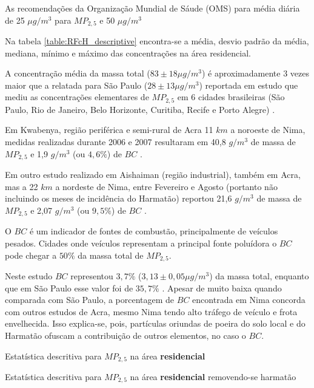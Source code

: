 As recomendações da Organização Mundial de Sáude (OMS) para média diária de 
25 $\mu g/m^3$ para $MP_{2,5}$ e 50 $\mu g/m^3$ 

Na tabela \ref{table:RFcH_descriptive} encontra-se a média, desvio padrão da média, 
mediana, mínimo e máximo das concentrações na área residencial. 

A concentração média da massa total ($83\pm 18 \mu g / m^3$) é aproximadamente
3 vezes maior que a relatada para São Paulo ($28\pm 13 \mu g / m^3$) reportada 
em estudo que mediu as concentrações elementares de $MP_{2,5}$ em 6 cidades 
brasileiras (São Paulo, Rio de Janeiro, Belo Horizonte, Curitiba, Recife e 
Porto Alegre) \cite{andrade2012}. 

Em Kwabenya, região periférica e semi-rural de Acra 11 $km$ a noroeste de Nima, 
medidas realizadas durante 2006 e 2007 resultaram em 40,8 $g / m^3$ de massa de 
$MP_{2,5}$ e 1,9 $g / m^3$ (ou $4,6\%$) de $BC$ \citep{aboh2009}.

Em outro estudo realizado em Aishaiman (região industrial), também em Acra, 
mas a 22 $km$ a nordeste de Nima, entre Fevereiro e Agosto (portanto não 
incluindo os meses de incidência do Harmatão) reportou 21,6 $g / m^3$ de massa 
de $MP_{2,5}$ e 2,07 $g / m^3$ (ou $9,5\%$) de $BC$ \citep{ofosu2012}.

O $BC$ é um indicador de fontes de combustão, principalmente de veículos pesados.
Cidades onde veículos representam a principal fonte poluídora o $BC$ pode chegar 
a $50\%$ da massa total de $MP_{2,5}$.  

Neste estudo $BC$ representou $3,7 \%$ ($3,13\pm 0,05 \mu g / m^3$) da massa 
total, enquanto que em São Paulo esse valor foi de $35,7 \%$ \citep{andrade2012}.
Apesar de muito baixa quando comparada com São Paulo, a porcentagem de $BC$ 
encontrada em Nima concorda com outros estudos de Acra, mesmo Nima tendo alto
tráfego de veículo e frota envelhecida. Isso explica-se, pois, partículas 
oriundas de poeira do solo local e do Harmatão ofuscam a contribuição de outros
elementos, no caso o $BC$. 

\begin{table}[H]
  \centering
    
  \caption{Estatística descritiva para $MP_{2,5}$ na área \textbf{residencial}
            \label{table:RFcH_descriptive}}
\end{table}

\begin{table}[H]
  \centering
    
  \caption{Estatística descritiva para $MP_{2,5}$ na área \textbf{residencial}
           removendo-se harmatão \label{table:RFsH_descriptive}}
\end{table}

